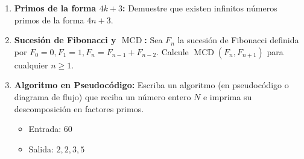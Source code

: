 \begin{enumerate}

    \item \textbf{Primos de la forma $4k+3$:}
    Demuestre que existen infinitos números primos de la forma $4n+3$.

    \item \textbf{Sucesión de Fibonacci y $\operatorname{MCD}$:}
    Sea $F_n$ la sucesión de Fibonacci definida por $F_0=0, F_1=1, F_{n}=F_{n-1}+F_{n-2}$.
    Calcule $\operatorname{MCD}(F_{n}, F_{n+1})$ para cualquier $n \ge 1$.

    \item \textbf{Algoritmo en Pseudocódigo:}
    Escriba un algoritmo (en pseudocódigo o diagrama de flujo) que reciba un número entero $N$ e imprima su descomposición en factores primos.
    \begin{itemize}
        \item Entrada: $60$
        \item Salida: $2, 2, 3, 5$
    \end{itemize}
\end{enumerate}
